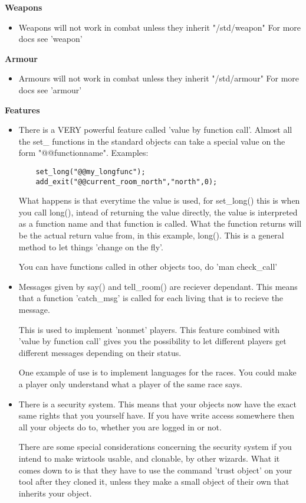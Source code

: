 {\bf Weapons}

\begin{itemize}
\item Weapons will not work in combat unless they inherit "/std/weapon"
  For more docs see 'weapon'
\end{itemize}

{\bf Armour}

\begin{itemize}
\item Armours will not work in combat unless they inherit "/std/armour"
  For more docs see 'armour'
\end{itemize}

{\bf Features}

\begin{itemize}
\item There is a VERY powerful feature called 'value by function call'. Almost
  all the set\_ functions in the standard objects can take a special value on
  the form "@@functionname". Examples:

\begin{verbatim}
    set_long("@@my_longfunc");
    add_exit("@@current_room_north","north",0);
\end{verbatim}

  What happens is that everytime the value is used, for set\_long() this is 
  when you call long(), intead of returning the value directly, the value
  is interpreted as a function name and that function is called. What the
  function returns will be the actual return value from, in this example, 
  long(). This is a general method to let things 'change on the fly'.

  You can have functions called in other objects too, do 'man check\_call'

\item Messages given by say() and tell\_room() are reciever dependant. This means
  that a function 'catch\_msg' is called for each living that is to recieve
  the message.

  This is used to implement 'nonmet' players. This feature combined with
  'value by function call' gives you the possibility to let different
  players get different messages depending on their status.

  One example of use is to implement languages for the races. You could make
  a player only understand what a player of the same race says.

\item There is a security system. This means that your objects now have the
  exact same rights that you yourself have. If you have write access somewhere
  then all your objects do to, whether you are logged in or not.

  There are some special considerations concerning the security system if you
  intend to make wiztools usable, and clonable, by other wizards. What it
  comes down to is that they have to use the command 'trust object' on your
  tool after they cloned it, unless they make a small object of their own that
  inherits your object.
\end{itemize}


